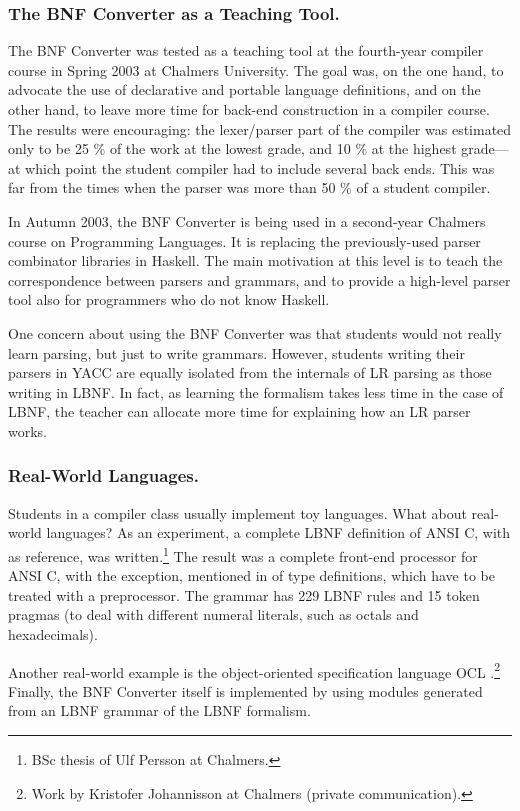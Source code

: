 \documentclass{llncs}
\newcommand{\shortsection}[1]{\subsubsection*{#1.}} %
\begin{document}
\shortsection{The BNF Converter as a Teaching Tool}

\label{results}

The BNF Converter was tested as a teaching tool at the 
fourth-year compiler course in Spring 2003 at Chalmers University.
The goal was, on the one hand, to advocate the use of declarative
and portable language definitions, and on the other hand, to
leave more time for back-end construction in a compiler course.
The results were encouraging: the lexer/parser part of the compiler 
was estimated only to be 25 \% of the work at the lowest grade, 
and 10 \% at the highest grade---at which point the student compiler had to 
include several back ends. This was far from the times 
when the parser was more than 50 \% of a student compiler.

In Autumn 2003, the BNF Converter is being used in a second-year Chalmers course
on Programming Languages. It is replacing the previously-used parser 
combinator libraries in Haskell.
The main motivation at this level is to teach the correspondence
between parsers and grammars, and to
provide a high-level parser tool also for programmers who do not know Haskell.

One concern about using the BNF Converter 
was that students would not really learn parsing, but just to write grammars. 
However, students writing their parsers in YACC 
are equally isolated from the internals of LR parsing as 
those writing in LBNF. In fact, as learning
the formalism takes less time in the case of LBNF, 
the teacher can allocate more
time for explaining how an LR parser works. 



\shortsection{Real-World Languages}

\label{real}

Students in a compiler class usually implement toy languages.
What about real-world languages?
As an experiment, a complete LBNF definition of
ANSI C, with \cite{Kern88} as reference, was 
written.\footnote{
BSc thesis of Ulf Persson at Chalmers.}
 The result was a complete front-end processor for ANSI C, 
with the exception, mentioned in \cite{Kern88} of type definitions,
which have to be treated with a preprocessor. The grammar has 229
LBNF rules and 15 token pragmas (to deal with different numeral
literals, such as octals and hexadecimals).

Another real-world example is the
object-oriented specification language OCL
\cite{WarmerKleppe99}.\footnote{
Work by Kristofer Johannisson at Chalmers (private communication).} 
Finally, the BNF Converter itself is implemented by 
using modules generated from an LBNF grammar of the LBNF formalism.
\end{document}
